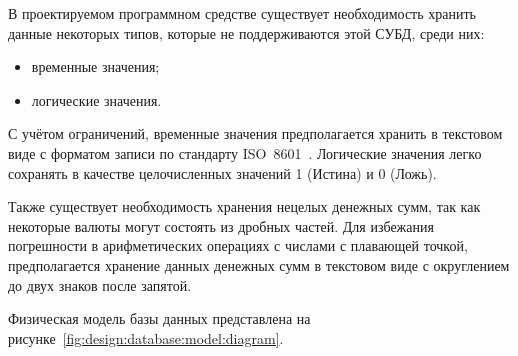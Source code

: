 В проектируемом программном средстве существует необходимость хранить данные некоторых типов, которые не поддерживаются этой СУБД, среди них:
\begin{itemize}
    \item временные значения;
    \item логические значения.
\end{itemize}

С учётом ограничений, временные значения предполагается хранить в текстовом виде с форматом записи по стандарту ISO~8601~\cite{iso_8601}.
Логические значения легко сохранять в качестве целочисленных значений 1 (Истина) и 0 (Ложь).

Также существует необходимость хранения нецелых денежных сумм, так как некоторые валюты могут состоять из дробных частей.
Для избежания погрешности в арифметических операциях с числами с плавающей точкой, предполагается хранение данных денежных сумм в текстовом виде с округлением до двух знаков после запятой.

Физическая модель базы данных представлена на рисунке~\ref{fig:design:database:model:diagram}.

